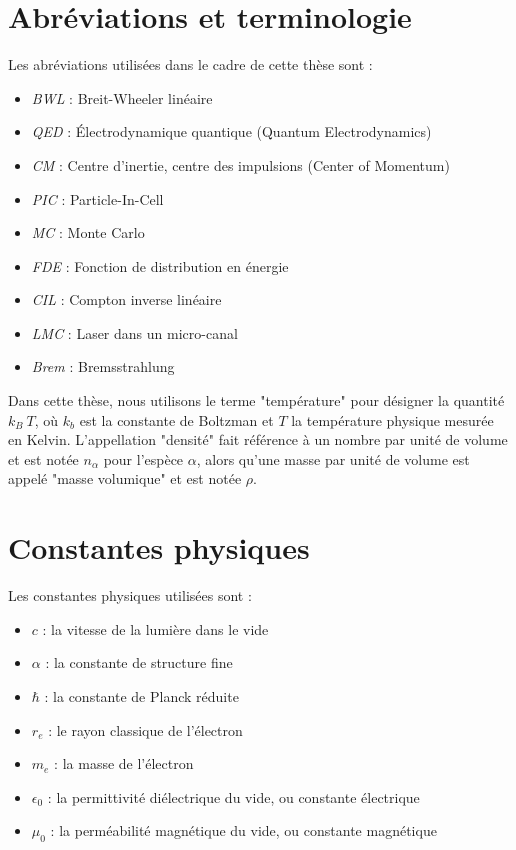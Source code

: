 \section*{Abréviations et terminologie}

Les abréviations utilisées dans le cadre de cette thèse sont :
\begin{itemize}
    \item \textit{BWL} : Breit-Wheeler linéaire
    \item \textit{QED} : Électrodynamique quantique (Quantum Electrodynamics)
    \item \textit{CM} : Centre d'inertie, centre des impulsions (Center of Momentum)
    \item \textit{PIC} : Particle-In-Cell
    \item \textit{MC} : Monte Carlo
    \item \textit{FDE} : Fonction de distribution en énergie
    \item \textit{CIL} : Compton inverse linéaire
    \item \textit{LMC} : Laser dans un micro-canal
    \item \textit{Brem} : Bremsstrahlung
\end{itemize}

Dans cette thèse, nous utilisons le terme "température" pour désigner la quantité $k_B ~ T$, où $k_b$ est la constante de Boltzman et $T$ la température physique mesurée en Kelvin.
L'appellation "densité" fait référence à un nombre par unité de volume et est notée $n_\alpha$ pour l'espèce $\alpha$, alors qu'une masse par unité de volume est appelé "masse volumique" et est notée $\rho$.

\section*{Constantes physiques}
Les constantes physiques utilisées sont :
\begin{itemize}
    \item $c$ : la vitesse de la lumière dans le vide
    \item $\alpha$ : la constante de structure fine
    \item $\hbar$ : la constante de Planck réduite
    \item $r_e$ : le rayon classique de l'électron
    \item $m_e$ : la masse de l'électron
    \item $\epsilon_0$ : la permittivité diélectrique du vide, ou constante électrique
    \item $\mu_0$ : la perméabilité magnétique du vide, ou constante magnétique
\end{itemize}

